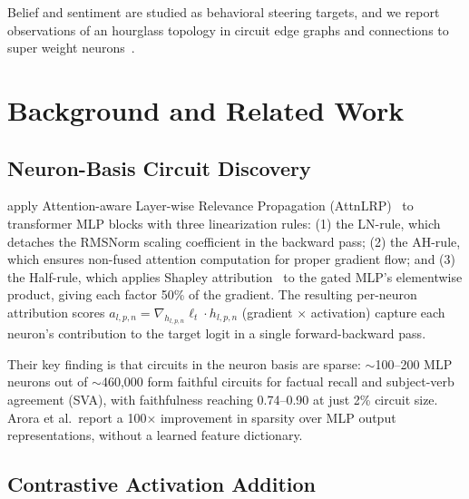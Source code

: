 \documentclass[11pt]{article}
\begin{document}
Belief and sentiment are studied as behavioral steering targets, and we report observations of an hourglass topology in circuit edge graphs and connections to super weight neurons~\citep{yu2024superweights}.


\section{Background and Related Work}
\label{sec:background}

\subsection{Neuron-Basis Circuit Discovery}
\label{sec:bg_neuron}

\citet{arora2025circuits} apply Attention-aware Layer-wise Relevance Propagation (AttnLRP)~\citep{achtibat2024relp} to transformer MLP blocks with three linearization rules: (1) the LN-rule, which detaches the RMSNorm scaling coefficient in the backward pass; (2) the AH-rule, which ensures non-fused attention computation for proper gradient flow; and (3) the Half-rule, which applies Shapley attribution~\citep{shapley1953value} to the gated MLP's elementwise product, giving each factor 50\% of the gradient.
The resulting per-neuron attribution scores $a_{l,p,n} = \nabla_{h_{l,p,n}} \ell_t \cdot h_{l,p,n}$ (gradient $\times$ activation) capture each neuron's contribution to the target logit in a single forward-backward pass.

Their key finding is that circuits in the neuron basis are sparse: ${\sim}$100--200 MLP neurons out of ${\sim}$460,000 form faithful circuits for factual recall and subject-verb agreement (SVA), with faithfulness reaching 0.74--0.90 at just 2\% circuit size.
Arora et al.\ report a 100$\times$ improvement in sparsity over MLP output representations, without a learned feature dictionary.

\subsection{Contrastive Activation Addition}
\label{sec:bg_caa}
\end{document}
